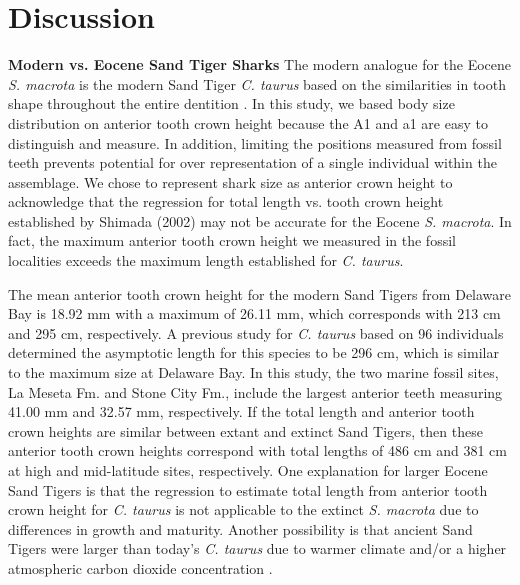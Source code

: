 \documentclass[]{rsos}%
\begin{document}
\section{Discussion}

\textbf{Modern vs. Eocene Sand Tiger Sharks}
The modern analogue for the Eocene \emph{S. macrota} is the modern Sand Tiger \emph{C. taurus} based on the similarities in tooth shape throughout the entire dentition \cite{Cunningham2000}. In this study, we based body size distribution on anterior tooth crown height because the A1 and a1 are easy to distinguish and measure. In addition, limiting the positions measured from fossil teeth prevents potential for over representation of a single individual within the assemblage. We chose to represent shark size as anterior crown height to acknowledge that the regression for total length vs. tooth crown height established by Shimada (2002) may not be accurate for the Eocene \emph{S. macrota}. In fact, the maximum anterior tooth crown height we measured in the fossil localities exceeds the maximum length established for \emph{C. taurus}. 

The mean anterior tooth crown height for the modern Sand Tigers from Delaware Bay is 18.92 mm with a maximum of 26.11 mm, which corresponds with 213 cm and 295 cm, respectively. 
A previous study for \emph{C. taurus} based on 96 individuals determined the asymptotic length for this species to be 296 cm\cite{Goldman2006}, which is similar to the maximum size at Delaware Bay.
In this study, the two marine fossil sites, La Meseta Fm. and Stone City Fm., include the largest anterior teeth measuring 41.00 mm and 32.57 mm, respectively. 
If the total length and anterior tooth crown heights are similar between extant and extinct Sand Tigers, then these anterior tooth crown heights correspond with total lengths of 486 cm and 381 cm at high and mid-latitude sites, respectively.
One explanation for larger Eocene Sand Tigers is that the regression to estimate total length from anterior tooth crown height for  \emph{C. taurus} is not applicable to the extinct \emph{S. macrota} due to differences in growth and maturity. 
Another possibility is that ancient Sand Tigers were larger than today's  \emph{C. taurus} due to warmer climate and/or a higher atmospheric carbon dioxide concentration \cite{Kim2020}.
\end{document}
